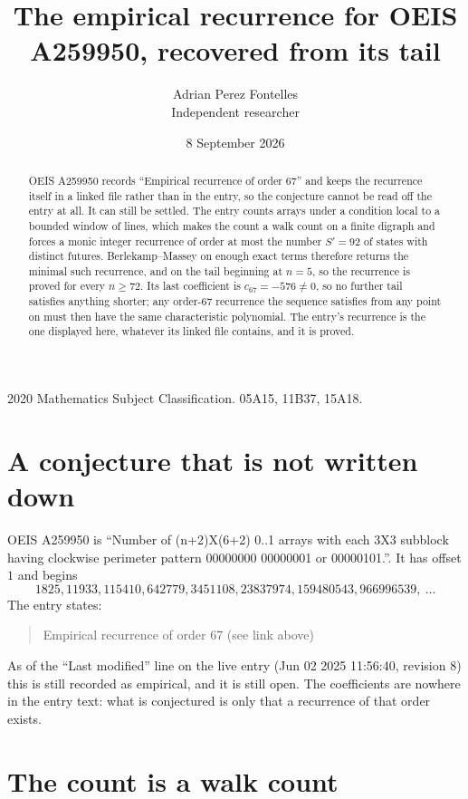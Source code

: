 \documentclass[11pt,a4paper]{article}
\title{The empirical recurrence for OEIS A259950, recovered from its tail}
\author{Adrian Perez Fontelles\\ \small Independent researcher}
\date{8 September 2026}
\theoremstyle{plain}
\theoremstyle{definition}
\begin{document}
\maketitle

\begin{abstract}
OEIS A259950 records ``Empirical recurrence of order $67$'' and keeps the recurrence itself in
a linked file rather than in the entry, so the conjecture cannot be read off the entry at all.
It can still be settled. The entry counts arrays under a condition local to a bounded window of
lines, which makes the count a walk count on a finite digraph and forces a monic integer
recurrence of order at most the number $S'=92$ of states with distinct futures. Berlekamp--Massey on
enough exact terms therefore returns the minimal such recurrence, and on the tail beginning at $n=5$, so the recurrence is proved for every $n\ge72$.
Its last coefficient is $c_{67}=-576\neq0$, so no further tail satisfies anything
shorter; any order-$67$ recurrence the sequence satisfies from any point on must then have
the same characteristic polynomial. The entry's recurrence is the one displayed here, whatever
its linked file contains, and it is proved.
\end{abstract}

\noindent\small 2020 Mathematics Subject Classification. 05A15, 11B37, 15A18.\normalsize

\section{A conjecture that is not written down}

OEIS A259950 is ``Number of (n+2)X(6+2) 0..1 arrays with each 3X3 subblock having clockwise perimeter pattern 00000000 00000001 or 00000101.''. It has offset $1$ and begins
\[
1825, 11933, 115410, 642779, 3451108, 23837974, 159480543, 966996539,\ \dots
\]
The entry states:
\begin{quote}
Empirical recurrence of order 67 (see link above)
\end{quote}
As of the ``Last modified'' line on the live entry (Jun 02 2025 11:56:40, revision 8)
this is still recorded as empirical, and it is still open. The coefficients are nowhere in the
entry text: what is conjectured is only that a recurrence of that order exists.

\section{The count is a walk count}
\end{document}

